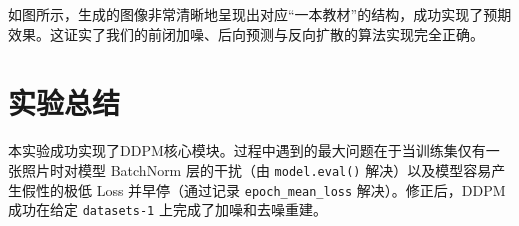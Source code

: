 \documentclass[11pt]{ctexart}
\begin{document}
如图所示，生成的图像非常清晰地呈现出对应“一本教材”的结构，成功实现了预期效果。这证实了我们的前闭加噪、后向预测与反向扩散的算法实现完全正确。

\section{实验总结}
本实验成功实现了DDPM核心模块。过程中遇到的最大问题在于当训练集仅有一张照片时对模型 BatchNorm 层的干扰（由 \texttt{model.eval()} 解决）以及模型容易产生假性的极低 Loss 并早停（通过记录 \texttt{epoch\_mean\_loss} 解决）。修正后，DDPM成功在给定 \texttt{datasets-1} 上完成了加噪和去噪重建。
\end{document}
